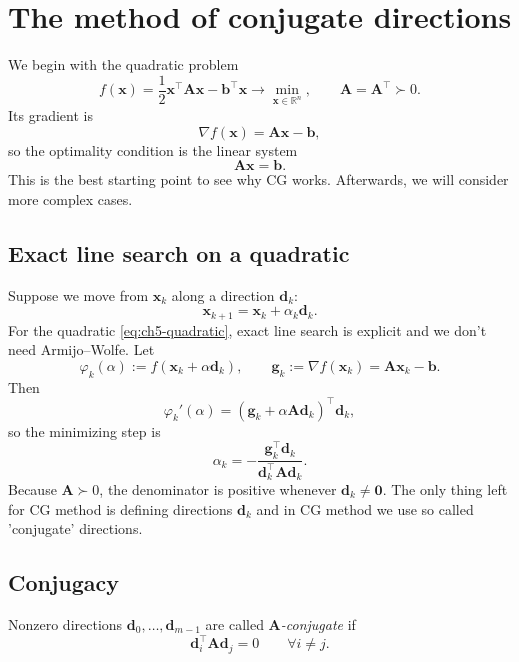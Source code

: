 \section{The method of conjugate directions}
\label{sec:ch5-conjugate-directions}
We begin with the quadratic problem
\begin{equation}
  \label{eq:ch5-quadratic}
  f(\mathbf{x})=\frac12 \mathbf{x}^{\top}\mathbf{A}\mathbf{x}
  -\mathbf{b}^{\top}\mathbf{x}
  \to \min_{\mathbf{x}\in\mathbb{R}^n},
  \qquad
  \mathbf{A}=\mathbf{A}^{\top}\succ 0.
\end{equation}
Its gradient is
\[
  \nabla f(\mathbf{x})=\mathbf{A}\mathbf{x}-\mathbf{b},
\]
so the optimality condition is the linear system
\[
  \mathbf{A}\mathbf{x}=\mathbf{b}.
\]
This is the best starting point to see why CG works. Afterwards, we
will consider more complex cases.

\subsection{Exact line search on a quadratic}
Suppose we move from $\mathbf{x}_k$ along a direction $\mathbf{d}_k$:
\[
  \mathbf{x}_{k+1}=\mathbf{x}_k+\alpha_k\mathbf{d}_k.
\]
For the quadratic \eqref{eq:ch5-quadratic}, exact line search is explicit
and we don't need Armijo--Wolfe. Let
\[
  \varphi_k(\alpha):=f(\mathbf{x}_k+\alpha \mathbf{d}_k),
  \qquad
  \mathbf{g}_k:=\nabla f(\mathbf{x}_k)=\mathbf{A}\mathbf{x}_k-\mathbf{b}.
\]
Then
\[
  \varphi_k'(\alpha)
  =(\mathbf{g}_k+\alpha \mathbf{A}\mathbf{d}_k)^{\top}\mathbf{d}_k,
\]
so the minimizing step is
\begin{equation}
  \label{eq:ch5-alpha-general}
  \alpha_k=-\frac{\mathbf{g}_k^{\top}\mathbf{d}_k}
  {\mathbf{d}_k^{\top}\mathbf{A}\mathbf{d}_k}.
\end{equation}
Because $\mathbf{A}\succ 0$, the denominator is positive whenever
$\mathbf{d}_k\neq \mathbf{0}$. The only thing left for CG method is 
defining directions $\mathbf{d}_k$ and in CG method we use so called
'conjugate' directions.
\subsection{Conjugacy}
\begin{definition}
\label{def:ch5-conjugacy}
Nonzero directions $\mathbf{d}_0,\ldots,\mathbf{d}_{m-1}$ are called
\emph{$\mathbf{A}$-conjugate} if
\[
  \mathbf{d}_i^{\top}\mathbf{A}\mathbf{d}_j=0
  \qquad \forall i\neq j.
\]
\end{definition}

